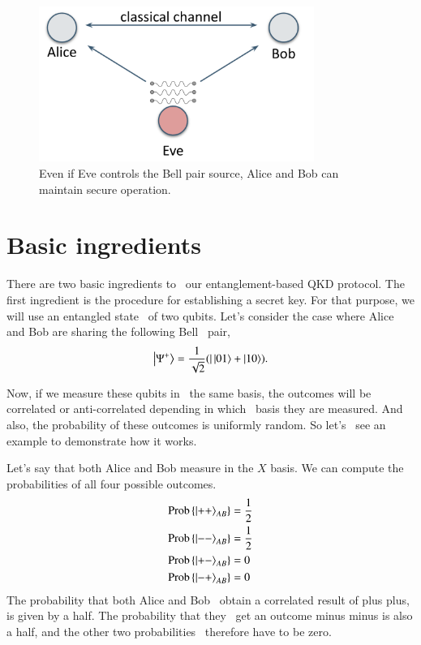 \begin{figure}[H]
    \centering
    \includegraphics[width=0.8\textwidth]{lesson10/e91-eve-as-source.png}
        \caption[E91 with Eve as Bell pair source]{Even if Eve controls the Bell pair source, Alice and Bob can maintain secure operation.}
    \label{fig:eve-e91}
\end{figure}

\section{Basic ingredients}

There are two basic ingredients to 
our entanglement-based QKD protocol.
The first ingredient is the procedure for
establishing a secret key.
For that purpose, we will use an entangled state 
of two qubits.
Let's consider the case where Alice and Bob are sharing the following Bell 
pair,
\begin{align}
\left| \Psi^{+} \right\rangle=\frac{1}{\sqrt{2}}(|\left| 01 \right\rangle+\left| 10 \right\rangle).
\end{align}

Now, if we measure these qubits in 
the same basis, the outcomes will be
correlated or anti-correlated depending in which 
basis they are measured. And also, the probability
of these outcomes is uniformly random. So let's 
see an example to demonstrate how it works.

Let's say that both Alice and Bob
measure in the $X$ basis. We can compute the 
probabilities of all four possible outcomes.
\begin{align}
\begin{aligned}
\operatorname{Prob}\left\{\left| ++ \right\rangle_{A B}\right\} &= \frac{1}{2} \\ 
\operatorname{Prob}\left\{\left| -- \right\rangle_{A B}\right\} &= \frac{1}{2} \\
\operatorname{Prob}\left\{\left| +- \right\rangle_{A B}\right\} &= 0 \\ 
\operatorname{Prob}\left\{\left| -+ \right\rangle_{A B}\right\} &= 0
\end{aligned}
\end{align}
The probability that both Alice and Bob 
obtain a correlated result of plus plus,
is given by a half. The probability that they 
get an outcome minus minus is also a half,
and the other two probabilities 
therefore have to be zero.

